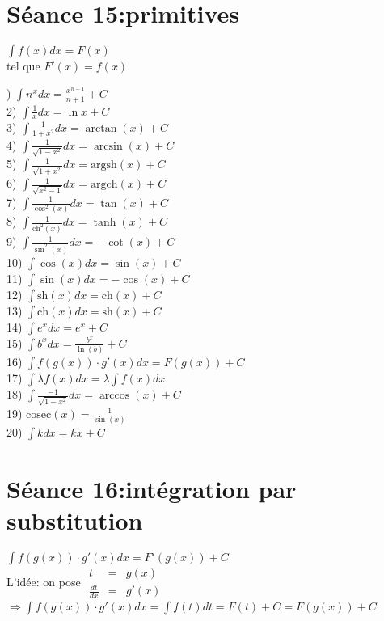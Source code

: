 \documentclass[12pt]{article}
\newcommand{\argsh}{\mathrm{argsh}} %
\newcommand{\argch}{\mathrm{argch}} %
\newcommand{\ch}{\mathrm{ch}}
\newcommand{\sh}{\mathrm{sh}}
\begin{document}
\section*{S\'eance 15:primitives}
$\int{f(x) dx} = F(x)$ \\
\indent tel que $F'(x) = f(x)$
\begin{multicols}{2}
) $\int{n^{x} dx} = \frac{x^{n+1}}{n+1} + C$ \\
2) $\int{\frac{1}{x} dx} = \ln{x} + C$ \\
3) $\int{\frac{1}{1+x^{2}} dx} = \arctan{(x)} + C$ \\
4) $\int{\frac{1}{\sqrt{1-x^{2}}} dx} = \arcsin{(x)} + C$ \\
5) $\int{\frac{1}{\sqrt{1+x^{2}}} dx} = \argsh(x) + C$ \\
6) $\int{\frac{1}{\sqrt{x^{2}-1}} dx} = \argch(x) + C$ \\
7) $\int{\frac{1}{\cos^{2}(x)} dx} = \tan(x) + C$ \\
8) $\int{\frac{1}{\ch^{2}(x)} dx} = \tanh(x) + C$ \\
9) $\int{\frac{1}{\sin^{2}(x)} dx} = -\cot(x) + C$ \\
10) $\int{\cos(x) dx} = \sin(x) + C$ \\
11) $\int{\sin(x) dx} = -\cos(x) + C$ \\
12) $\int{\sh(x) dx} = \ch(x) + C$ \\
13) $\int{\ch(x) dx} = \sh(x) + C$ \\
14) $\int{e^{x} dx} = e^{x} + C$ \\
15) $\int{b^{x} dx} = \frac{b^{x}}{\ln(b)} + C$ \\
16) $\int{f(g(x))\cdot g'(x) dx} = F(g(x)) + C$ \\
17) $\int{\lambda f(x) dx} = \lambda \int{f(x) dx}$ \\
18) $\int{\frac{-1}{\sqrt{1-x^{2}}} dx} = \arccos(x) + C$ \\
19) $\mathrm{cosec}(x) = \frac{1}{\sin(x)}$ \\
20) $\int{k dx} = kx + C$
\end{multicols}

\section*{S\'eance 16:int\'egration par substitution}
$\int{f(g(x))\cdot g'(x) dx} = F'(g(x)) + C$ \\
\newline
L'id\'ee: on pose 
\(\begin{array}{ccc} 
t &=& g(x) \\ 
\frac{dt}{dx} &=& g'(x) 
\end{array} \) $\Rightarrow \int{f(g(x)) \cdot g'(x) dx} = \int{f(t) dt} = F(t) + C = F(g(x)) + C$ \\
\end{document}
